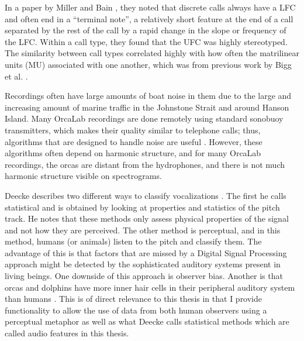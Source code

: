 In a paper by Miller and Bain \cite{miller2000variation}, they noted
that discrete calls always have a LFC and often end in a ``terminal
note'', a relatively short feature at the end of a call separated by
the rest of the call by a rapid change in the slope or frequency of
the LFC.  Within a call type, they found that the UFC was highly
stereotyped.  The similarity between call types correlated highly with
how often the matrilinear units (MU) associated with one another,
which was from previous work by Bigg et al. \cite{bigg1990orca}.

Recordings often have large amounts of boat noise in them due to the
large and increasing amount of marine traffic in the Johnstone
Strait and around Hanson Island.  Many OrcaLab recordings are done
remotely using standard sonobuoy transmitters, which makes their quality
similar to telephone calls; thus, algorithms that are designed to
handle noise are useful \cite{wang2000pitch}.  However, these
algorithms often depend on harmonic structure, and for many OrcaLab
recordings, the orcas are distant from the hydrophones, and there is
not much harmonic structure visible on spectrograms.

Deecke describes two different ways to classify vocalizations
\cite{deecke1999quantifying}.  The first he calls statistical and is
obtained by looking at properties and statistics of the pitch track.
He notes that these methods only assess physical properties of the
signal and not how they are perceived.  The other method is
perceptual, and in this method, humans (or animals) listen to the
pitch and classify them.  The advantage of this is that factors that
are missed by a Digital Signal Processing approach might be detected
by the sophisticated auditory systems present in living beings.  One
downside of this approach is observer bias.  Another is that orcas and
dolphins have more inner hair cells in their peripheral auditory
system than humans \cite{au2000hearing}.  This is of direct relevance
to this thesis in that I provide functionality to allow the use of
data from both human observers using a perceptual metaphor as well as
what Deecke calls statistical methods which are called audio features
in this thesis.

